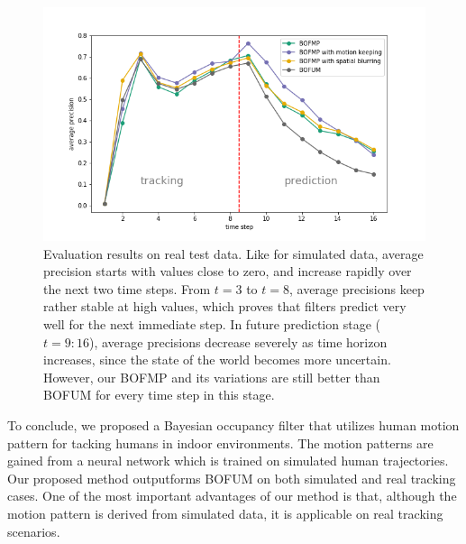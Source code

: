 \begin{figure}[ht]
  \centering
   \captionsetup{width=\linewidth}
    \includegraphics[width=.8\textwidth]{figures/test_on_real_data.png}
    \caption{Evaluation results on real test data. Like for simulated data, average precision starts with values close to zero, and increase rapidly over the next two time steps. From $t=3$ to $t=8$, average precisions keep rather stable at high values, which proves that filters predict very well for the next immediate step. In future prediction stage ($t=9:16$), average precisions decrease severely as time horizon increases, since the state of the world becomes more uncertain. However, our BOFMP and its variations are still better than BOFUM for every time step in this stage.}
    \label{fig:real_test_data}
\end{figure}

To conclude, we proposed a Bayesian occupancy filter that utilizes human motion pattern for tacking humans in indoor environments. The motion patterns are gained from a neural network which is trained on simulated human trajectories. Our proposed method outputforms BOFUM on both simulated and real tracking cases. One of the most important advantages of our method is that, although the motion pattern is derived from simulated data, it is applicable on real tracking scenarios.  











